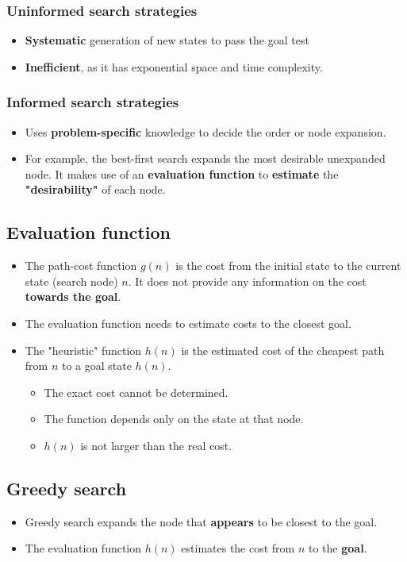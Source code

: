 \documentclass[11pt]{article}
\begin{document}
\subsubsection{Uninformed search strategies}
\label{sec:orgf8f9e67}
\begin{itemize}
\item \textbf{Systematic} generation of new states to pass the goal test
\item \textbf{Inefficient}, as it has exponential space and time complexity.
\end{itemize}
\subsubsection{Informed search strategies}
\label{sec:org4cc9667}
\begin{itemize}
\item Uses \textbf{problem-specific} knowledge to decide the order or node expansion.
\item For example, the best-first search expands the most desirable unexpanded node.
It makes use of an \textbf{evaluation function} to \textbf{estimate} the \textbf{"desirability"} of each node.
\end{itemize}
\subsection{Evaluation function}
\label{sec:org4f62151}
\begin{itemize}
\item The path-cost function \(g(n)\) is the cost from the initial state to the current state (search node) \(n\). It does not provide any information on the cost \textbf{towards the goal}.
\item The evaluation function needs to estimate costs to the closest goal.
\item The "heuristic" function \(h(n)\) is the estimated cost of the cheapest path from \(n\) to a goal state \(h(n)\).
\begin{itemize}
\item The exact cost cannot be determined.
\item The function depends only on the state at that node.
\item \(h(n)\) is not larger than the real cost.
\end{itemize}
\end{itemize}
\subsection{Greedy search}
\label{sec:org71a1e94}
\begin{itemize}
\item Greedy search expands the node that \textbf{appears} to be closest to the goal.
\item The evaluation function \(h(n)\) estimates the cost from \(n\) to the \textbf{goal}.
\end{itemize}
\end{document}
